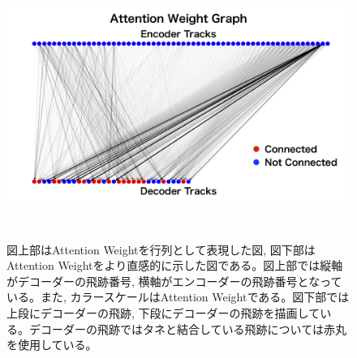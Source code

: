 \begin{figure}[htbp]
   \begin{minipage}{1.0\textwidth}
   \centering
    \includegraphics[trim = 50 0 50 0, width=1.0\textwidth, clip]{Figure/3Networks/3-4-3-3AttentionWeightGraph.png}
   \end{minipage}
  \caption[Attention Weight]{図上部はAttention Weightを行列として表現した図, 図下部はAttention Weightをより直感的に示した図である。図上部では縦軸がデコーダーの飛跡番号, 横軸がエンコーダーの飛跡番号となっている。また, カラースケールはAttention Weightである。図下部では上段にデコーダーの飛跡, 下段にデコーダーの飛跡を描画している。デコーダーの飛跡ではタネと結合している飛跡については赤丸を使用している。}
  \label{3-4-3-3AttentionWeight}
\end{figure}



























